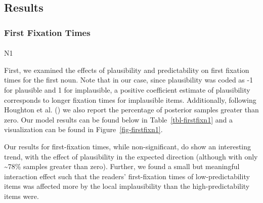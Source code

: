 \documentclass[
  12pt,
  letterpaper,
]{scrreprt}
\makeatletter
\let\oldparagraph\paragraph
\renewcommand{\paragraph}{
    \@ifstar
      \xxxParagraphStar
      \xxxParagraphNoStar
  }
\newcommand{\xxxParagraphStar}[1]{\oldparagraph*{#1}\mbox{}}
\newcommand{\xxxParagraphNoStar}[1]{\oldparagraph{#1}\mbox{}}
\makeatother
\begin{document}
\subsection{Results}\label{results-3}

\subsubsection{First Fixation Times}\label{first-fixation-times-1}

\paragraph{N1}\label{n1-4}

First, we examined the effects of plausibility and predictability on
first fixation times for the first noun. Note that in our case, since
plausibility was coded as -1 for plausible and 1 for implausible, a
positive coefficient estimate of plausibility corresponds to longer
fixation times for implausible items. Additionally, following Houghton
et al.
()
we also report the percentage of posterior samples greater than zero.
Our model results can be found below in Table~\ref{tbl-firstfixn1} and a
visualization can be found in Figure~\ref{fig-firstfixn1}.

Our results for first-fixation times, while non-significant, do show an
interesting trend, with the effect of plausibility in the expected
direction (although with only \textasciitilde78\% samples greater than
zero). Further, we found a small but meaningful interaction effect such
that the readers' first-fixation times of low-predictability items was
affected more by the local implausibility than the high-predictability
items were.
\end{document}
